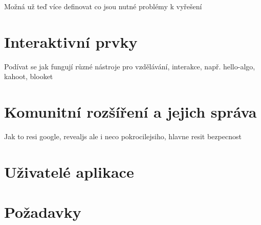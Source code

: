 Možná už teď více definovat co jsou nutné problémy k vyřešení

\section{Interaktivní prvky}

Podívat se jak fungují různé nástroje pro vzdělávání, interakce, např. hello-algo, kahoot, blooket

\section{Komunitní rozšíření a jejich správa}

Jak to resi google, revealjs ale i neco pokrocilejsiho, hlavne resit bezpecnost

\section{Uživatelé aplikace}

\section{Požadavky}